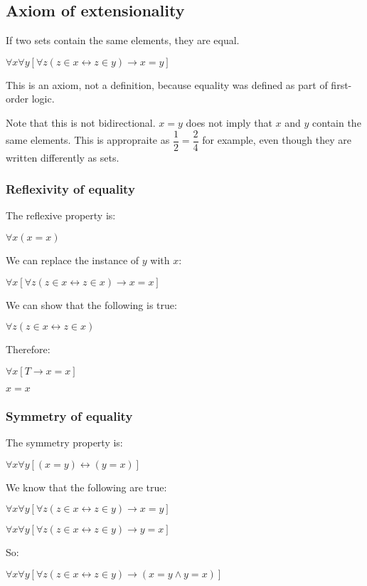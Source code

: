 
\subsection{Axiom of extensionality}

If two sets contain the same elements, they are equal.

\(\forall x \forall y[\forall z(z\in x \leftrightarrow z\in y)\rightarrow x=y]\)

This is an axiom, not a definition, because equality was defined as part of first-order logic.

Note that this is not bidirectional. \(x=y\) does not imply that \(x\) and \(y\) contain the same elements. This is appropraite as \(\dfrac{1}{2}= \dfrac{2}{4}\) for example, even though they are written differently as sets.

\subsubsection{Reflexivity of equality}

The reflexive property is:

\(\forall x(x=x)\)

We can replace the instance of \(y\)  with \(x\):

\(\forall x [\forall z(z\in x \leftrightarrow z\in x)\rightarrow x=x]\)

We can show that the following is true:

\(\forall z(z\in x \leftrightarrow z\in x)\)

Therefore:

\(\forall x [T \rightarrow x=x]\)

\(x=x\)

\subsubsection{Symmetry of equality}

The symmetry property is:

\(\forall x \forall y[(x=y)\leftrightarrow (y=x)]\)

We know that the following are true:

\(\forall x \forall y[\forall z(z\in x \leftrightarrow z\in y)\rightarrow x=y]\)

\(\forall x \forall y[\forall z(z\in x \leftrightarrow z\in y)\rightarrow y=x]\)

So:

\(\forall x \forall y[\forall z(z\in x \leftrightarrow z\in y)\rightarrow (x=y\land y=x)]\)

